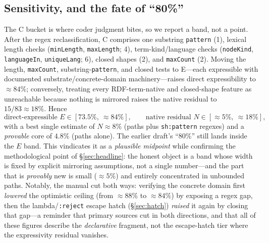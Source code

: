 \documentclass[11pt,letterpaper]{article}
\theoremstyle{definition}
\newcommand{\rdf}{RDF}
\begin{document}
\subsection{Sensitivity, and the fate of ``80\%''}
The C bucket is where coder judgment bites, so we report a band, not a point. After the regex reclassification, C comprises one substring \texttt{pattern} (1), lexical length checks (\texttt{minLength}, \texttt{maxLength}; 4), term-kind/language checks (\texttt{nodeKind}, \texttt{languageIn}, \texttt{uniqueLang}; 6), closed shapes (2), and \texttt{maxCount} (2). Moving the length, \texttt{maxCount}, substring-\texttt{pattern}, and closed tests to E---each expressible with documented substrate/concrete-domain machinery---raises direct expressibility to $\approx 84\%$; conversely, treating every \rdf{}-term-native and closed-shape feature as unreachable because nothing is mirrored raises the native residual to $15/83 \approx 18\%$. Hence
\[
\text{direct-expressible } E \in [73.5\%,\ \approx\!84\%], \qquad \text{native residual } N \in [\approx\!5\%,\ \approx\!18\%],
\]
with a best single estimate of $N \approx 8\%$ (paths plus \texttt{sh:pattern} regexes) and a \emph{provable} core of $4.8\%$ (paths alone). The earlier draft's ``$80\%$'' still lands inside the $E$ band. This vindicates it as a \emph{plausible midpoint} while confirming the methodological point of \S\ref{sec:headline}: the honest object is a band whose width is fixed by explicit mirroring assumptions, not a single number---and the part that is \emph{provably} new is small ($\approx 5\%$) and entirely concentrated in unbounded paths. Notably, the manual cut both ways: verifying the concrete domain first \emph{lowered} the optimistic ceiling (from $\approx 88\%$ to $\approx 84\%$) by exposing a regex gap, then the lambda/\texttt{:reject} escape hatch (\S\ref{sec:hatch}) \emph{raised} it again by closing that gap---a reminder that primary sources cut in both directions, and that all of these figures describe the \emph{declarative} fragment, not the escape-hatch tier where the expressivity residual vanishes.
\end{document}
